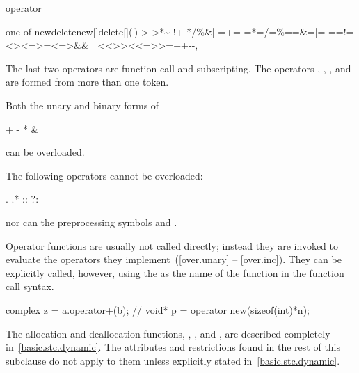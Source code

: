 \begin{bnf}
\br
     operator
\end{bnf}

\begin{bnfkeywordtab}
 \textnormal{one of}\br
\>new\>delete\>new[]\>delete[]\>(\,)\>[\,]\>->\>->*\>\~\br
\>!\>+\>-\>*\>/\>\%\>\caret\>\&\>|\br
\>=\>+=\>-=\>*=\>/=\>\%=\>\caret=\>\&=\>|=\br
\>={=}\>!=\><\>>\><=\>>=\><=>\>\&\&\>|{|}\br
\><<\>>>\><<=\>>>=\>++\>-{-}\>,\br
\end{bnfkeywordtab}
\begin{note}
The last two operators are function call
and subscripting.
The operators
,
,
\tcode{()},
and
\tcode{[]}
are formed from more than one token.
\end{note}
%
%

\pnum
Both the unary and binary forms of

\begin{codeblock}
+    -    *     &
\end{codeblock}

can be overloaded.

\pnum
{}%
The following operators cannot be overloaded:

\begin{codeblock}
.    .*   ::    ?:
\end{codeblock}

nor can the preprocessing symbols
\tcode{\#}
and
\tcode{\#\#}.

\pnum
{}%
Operator functions are usually not called directly; instead they are invoked
to evaluate the operators they implement~(\ref{over.unary} -- \ref{over.inc}).
They can be explicitly called, however, using the
as the name of the function in the function call syntax.
\begin{example}

\begin{codeblock}
complex z = a.operator+(b);     // 
void* p = operator new(sizeof(int)*n);
\end{codeblock}
\end{example}

\pnum
The allocation and deallocation functions,
,
,
and
,
are described completely in~\ref{basic.stc.dynamic}.
The attributes and restrictions
found in the rest of this subclause do not apply to them unless explicitly
stated in~\ref{basic.stc.dynamic}.

